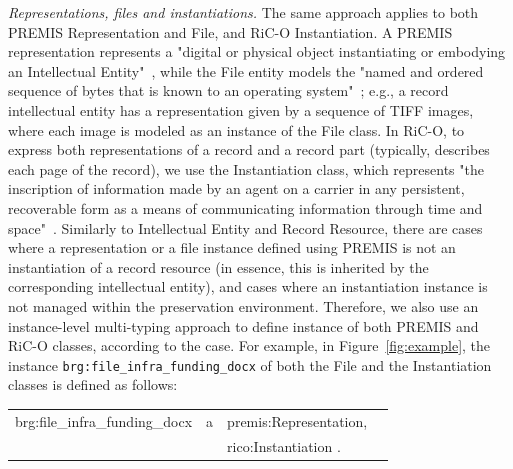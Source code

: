\documentclass[runningheads]{llncs}
\makeatletter
\newenvironment{rdfexpressions}
{%
	\par
	\begingroup
	\centering
	\ttfamily
	\begin{tabular}{@{}r@{\ }l@{\ }l@{}l@{}}
	}
	{%
	\end{tabular}
	\par
	\endgroup
}
\makeatother
\begin{document}
\emph{Representations, files and instantiations.}
The same approach applies to both 
PREMIS Representation and File, and RiC-O Instantiation.
A PREMIS representation represents a "digital or physical object instantiating or embodying an Intellectual Entity"~\cite{premis_data_dictionary_2015}, while the File entity models the "named and ordered sequence of bytes that is known to an operating system"~\cite{premis_data_dictionary_2015}; e.g., a record intellectual entity has a representation given by a sequence of TIFF images, where each image is modeled as an instance of the File class. In RiC-O, to express both representations of a record and a record part (typically, describes each page of the record), we use the Instantiation class, which represents "the inscription of information made by an agent on a carrier in any persistent, recoverable form as a means of communicating information through time and space"~\cite{RiCO,clavaud2021ica}. Similarly to Intellectual Entity and Record Resource, there are cases where a representation or a file instance defined using PREMIS is not an instantiation of a record resource (in essence, this is inherited by the corresponding intellectual entity), and cases where an instantiation instance is not managed within the preservation environment. Therefore, we also use an instance-level multi-typing approach to define instance of both PREMIS and RiC-O classes, according to the case. For example, in Figure~\ref{fig:example}, the instance \texttt{brg:file\_infra\_funding\_docx} of both the File and the Instantiation classes is defined as follows:
\begin{rdfexpressions}
	brg:file\_infra\_funding\_docx & a & premis:Representation,& \\
	& & rico:Instantiation .
\end{rdfexpressions}
\end{document}
